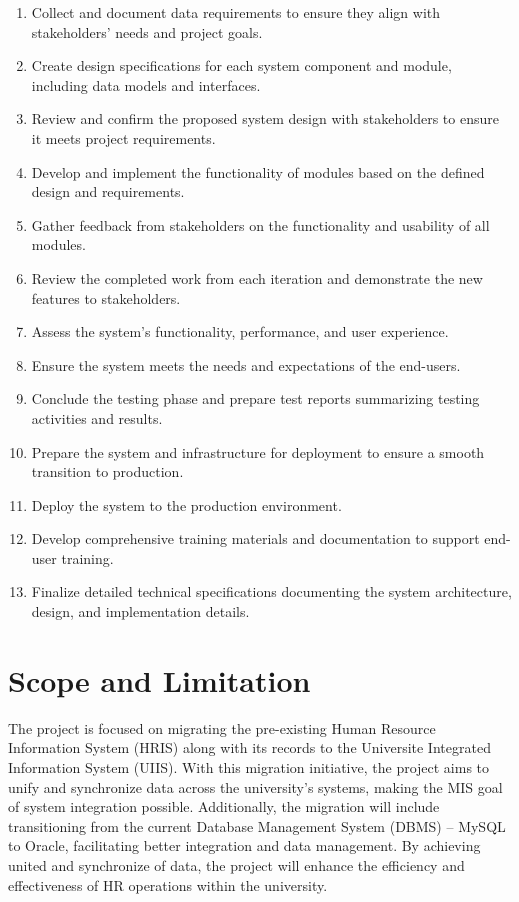     \begin{enumerate}
        \item Collect and document data requirements to ensure they align with stakeholders' needs and project goals.
        \item Create design specifications for each system component and module, including data models and interfaces.
        \item Review and confirm the proposed system design with stakeholders to ensure it meets project requirements.
        \item Develop and implement the functionality of modules based on the defined design and requirements.

        \item Gather feedback from stakeholders on the functionality and usability of all modules.
        \item Review the completed work from each iteration and demonstrate the new features to stakeholders.
        \item Assess the system's functionality, performance, and user experience.
        \item Ensure the system meets the needs and expectations of the end-users.
        \item Conclude the testing phase and prepare test reports summarizing testing activities and results.
        \item Prepare the system and infrastructure for deployment to ensure a smooth transition to production.
        \item Deploy the system to the production environment.
        \item Develop comprehensive training materials and documentation to support end-user training.
        \item Finalize detailed technical specifications documenting the system architecture, design, and implementation details.
    \end{enumerate}
    
\section{Scope and Limitation}

    The project is focused on migrating the pre-existing Human Resource Information System (HRIS) along with its records to the Universite Integrated Information System (UIIS). With this migration initiative, the project aims to unify and synchronize data across the university's systems, making the MIS goal of system integration possible. Additionally, the migration will include transitioning from the current Database Management System (DBMS) -- MySQL to Oracle, facilitating better integration and data management. By achieving united and synchronize of data, the project will enhance the efficiency and effectiveness of HR operations within the university.

